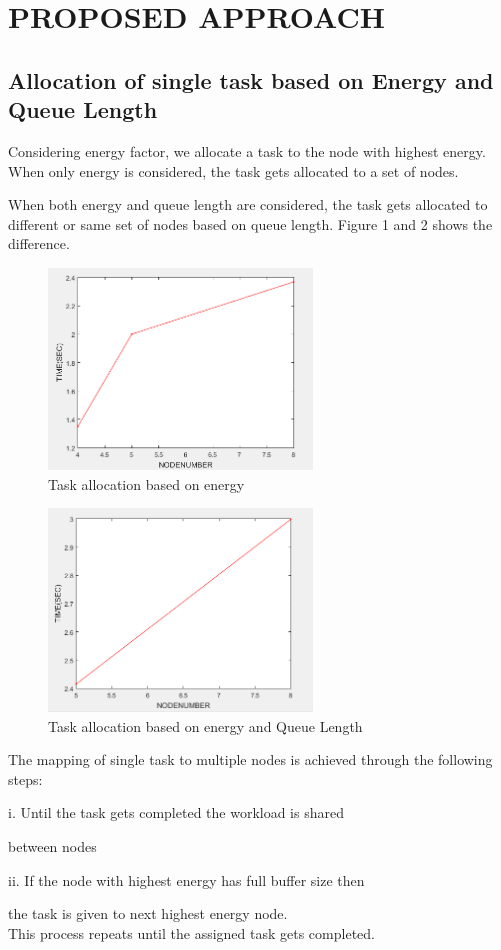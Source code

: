 \documentclass[conference]{IEEEtran}
\begin{document}
\section{PROPOSED APPROACH}
\subsection{Allocation of single task based on Energy and Queue Length}
\par Considering energy factor, we allocate a task to the node with highest energy. When only energy is considered, the task gets allocated to a set of nodes.
\par When both energy and queue length are considered, the task gets allocated to different or same set of nodes based on queue length. Figure 1 and 2 shows the difference.\\
\begin{figure}[H]
\includegraphics[width= 7cm,frame,center]{fig3.png}
 
  \caption{Task allocation based on energy}
  \label{fig:1}
\end{figure}

\begin{figure}[H]
\includegraphics[width=7cm,frame,center]{fig4.png}
  \caption{Task allocation based on energy and Queue Length}
  \label{fig:2}
\end{figure}

The mapping of single task to multiple nodes is achieved through the following steps:
\par i. Until the task gets completed the workload is shared\par  between nodes
\par ii. If the node with highest energy has full buffer size then\par the task is given to next highest energy node.\\
 This process repeats until the assigned task gets completed.
\end{document}
